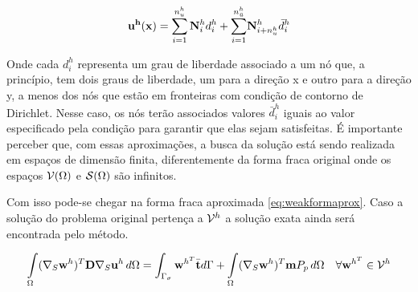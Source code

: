 \begin{equation}\label{eq:udiscret}
\mathbf{u^h}(\mathbf{x}) = \sum_{i=1}^{n_u^h} {\mathbf{N}_{i}^h}  d_i^h + {\sum_{i=1}^ {n^h_{\bar{u}}}}  \mathbf{N}_{i+n_u^h}^h \bar{d}_i^h
\end{equation}



Onde cada $d_i^h$ representa um grau de liberdade associado a um nó que, a princípio, tem dois graus de liberdade, um para a direção x e outro para a direção y, a menos dos nós que estão em fronteiras com condição de contorno de Dirichlet. Nesse caso, os nós terão associados valores $\bar{d}_i^h$  iguais ao valor especificado pela condição para garantir que elas sejam satisfeitas. É importante perceber que, com essas aproximações, a busca da solução está sendo realizada em espaços de dimensão finita, diferentemente da forma fraca original onde os espaços $\mathcal{V}(\Omega)$ e $\mathcal{S}(\Omega)$ são infinitos.


Com isso pode-se chegar na forma fraca aproximada \eqref{eq:weakformaprox}. Caso a solução do problema original pertença a $\mathcal{V}^h$ a solução exata ainda será encontrada pelo método.

\begin{equation}\label{eq:weakformaprox}
\int\limits_{\Omega}  (\nabla_S \mathbf{w}^h)^T \mathbf{D} \nabla_S  \mathbf{u}^h \, d\Omega  =  \int_{\Gamma_\sigma} \mathbf{w}^{h^T} \bar{\mathbf{t}} d\Gamma  +  \int\limits_{\Omega} (\nabla_S\mathbf{w}^h)^T \mathbf{m} P_p \, d\Omega  \quad \forall \mathbf{w}^{h^T} \in \mathcal{V}^h
\end{equation}




